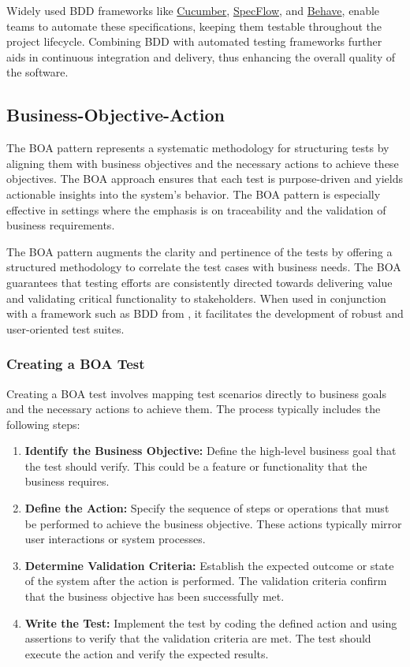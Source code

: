 Widely used \ac{BDD} frameworks like \href{https://cucumber.io}{Cucumber}, \href{https://specflow.org/}{SpecFlow}, and \href{https://behave.readthedocs.io/en/latest/#}{Behave}, enable teams to automate these specifications, keeping them testable throughout the project lifecycle. Combining BDD with automated testing frameworks further aids in continuous integration and delivery, thus enhancing the overall quality of the software.

\subsection{Business-Objective-Action}

The \ac{BOA} pattern represents a systematic methodology for structuring tests by aligning them with business objectives and the necessary actions to achieve these objectives. The \ac{BOA} approach ensures that each test is purpose-driven and yields actionable insights into the system's behavior. The \ac{BOA} pattern is especially effective in settings where the emphasis is on traceability and the validation of business requirements. 

The \ac{BOA} pattern augments the clarity and pertinence of the tests by offering a structured methodology to correlate the test cases with business needs. The \ac{BOA} guarantees that testing efforts are consistently directed towards delivering value and validating critical functionality to stakeholders. When used in conjunction with a framework such as \ac{BDD} from , it facilitates the development of robust and user-oriented test suites.

\subsubsection{Creating a BOA Test}

Creating a \ac{BOA} test involves mapping test scenarios directly to business goals and the necessary actions to achieve them. The process typically includes the following steps:

\begin{enumerate}
    \item \textbf{Identify the Business Objective:} Define the high-level business goal that the test should verify. This could be a feature or functionality that the business requires.
    \item \textbf{Define the Action:} Specify the sequence of steps or operations that must be performed to achieve the business objective. These actions typically mirror user interactions or system processes.
    \item \textbf{Determine Validation Criteria:} Establish the expected outcome or state of the system after the action is performed. The validation criteria confirm that the business objective has been successfully met.
    \item \textbf{Write the Test:} Implement the test by coding the defined action and using assertions to verify that the validation criteria are met. The test should execute the action and verify the expected results.
\end{enumerate}

